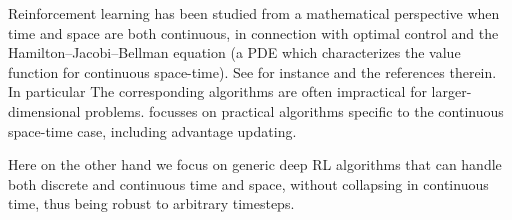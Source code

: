 
Reinforcement learning has been studied from a mathematical perspective
when time and space are both continuous, in connection with optimal
control and the Hamilton--Jacobi--Bellman equation (a PDE which
characterizes the value function for continuous space-time). See for
instance
\cite{cont_rl,MunosBourgines98} and the references therein. In particular   The corresponding algorithms are
often impractical \cite{cont_rl} for larger-dimensional problems.
\cite{cont_rl} focusses on practical algorithms specific to the continuous
space-time case, including advantage updating.

Here on the other hand we focus on generic deep RL algorithms that can handle
both discrete and continuous time and space, without collapsing in
continuous time, thus being robust to arbitrary timesteps.


